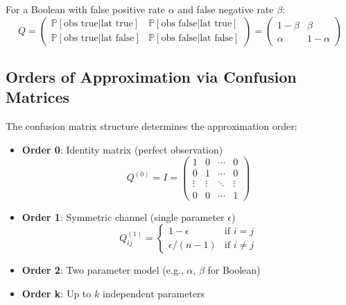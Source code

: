 \begin{example}
For a Boolean with false positive rate $\alpha$ and false negative rate $\beta$:
\begin{equation}
Q = \begin{pmatrix}
\mathbb{P}[\text{obs true} | \text{lat true}] & \mathbb{P}[\text{obs false} | \text{lat true}] \\
\mathbb{P}[\text{obs true} | \text{lat false}] & \mathbb{P}[\text{obs false} | \text{lat false}]
\end{pmatrix} = \begin{pmatrix}
1-\beta & \beta \\
\alpha & 1-\alpha
\end{pmatrix}
\end{equation}
\end{example}

\subsection{Orders of Approximation via Confusion Matrices}

The confusion matrix structure determines the approximation order:

\begin{definition}
\begin{itemize}
\item \textbf{Order 0}: Identity matrix (perfect observation)
\begin{equation}
Q^{(0)} = I = \begin{pmatrix}
1 & 0 & \cdots & 0 \\
0 & 1 & \cdots & 0 \\
\vdots & \vdots & \ddots & \vdots \\
0 & 0 & \cdots & 1
\end{pmatrix}
\end{equation}

\item \textbf{Order 1}: Symmetric channel (single parameter $\epsilon$)
\begin{equation}
Q^{(1)}_{ij} = \begin{cases}
1-\epsilon & \text{if } i = j \\
\epsilon/(n-1) & \text{if } i \neq j
\end{cases}
\end{equation}

\item \textbf{Order 2}: Two parameter model (e.g., $\alpha$, $\beta$ for Boolean)

\item \textbf{Order k}: Up to $k$ independent parameters
\end{itemize}
\end{definition}

